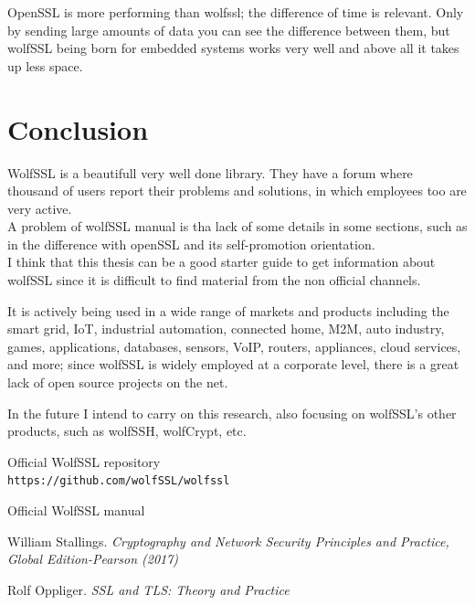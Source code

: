 \documentclass[a4paper,12pt]{report}
\begin{document}
OpenSSL is more performing than wolfssl; the difference of time is relevant.
Only by sending large amounts of data you can see the difference between them, but wolfSSL being born for embedded systems works very well and above all it takes up less space.

\chapter{Conclusion}
WolfSSL is a beautifull very well done library. They have a forum where thousand of users report their problems and solutions, in which employees too are very active.
\\A problem of wolfSSL manual is tha lack of some details in some sections, such as in the difference with openSSL and its self-promotion orientation.
\\ I think that this thesis can be a good starter guide to get information about wolfSSL since it is difficult to find material from the non official channels.

\vspace{5mm} %
It is actively being used in a wide range of markets and products including the smart grid, IoT, industrial automation, connected home, M2M, auto industry, games, applications, databases, sensors, VoIP, routers, appliances, cloud services, and more; since wolfSSL is widely employed at a corporate level, there is a great lack of open source projects on the net.

\vspace{5mm} %
In the future I intend to carry on this research, also focusing on wolfSSL's other products, such as wolfSSH, wolfCrypt, etc.



\begin{thebibliography}{9}

Official WolfSSL repository
\\\texttt{https://github.com/wolfSSL/wolfssl}

Official WolfSSL manual

William Stallings. \textit{ Cryptography and Network Security Principles and Practice, Global Edition-Pearson (2017)}

Rolf Oppliger. \textit{SSL and TLS: Theory and Practice}
\end{thebibliography}
\end{document}
